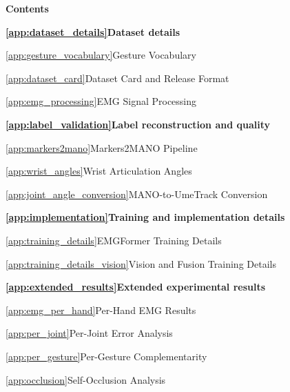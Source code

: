 \documentclass[letterpaper]{article} %
\begin{document}
\begingroup
\small
\setlength{\parskip}{1pt}
\noindent\textbf{Contents}\par
\smallskip
\noindent
\textbf{\ref{app:dataset_details}\quad Dataset details}
  \dotfill \pageref{app:dataset_details}\par
\hspace*{1.5em}\ref{app:gesture_vocabulary}\quad Gesture Vocabulary
  \dotfill \pageref{app:gesture_vocabulary}\par
\hspace*{1.5em}\ref{app:dataset_card}\quad Dataset Card and Release Format
  \dotfill \pageref{app:dataset_card}\par
\hspace*{1.5em}\ref{app:emg_processing}\quad EMG Signal Processing
  \dotfill \pageref{app:emg_processing}\par
\smallskip
\noindent
\textbf{\ref{app:label_validation}\quad Label reconstruction and quality}
  \dotfill \pageref{app:label_validation}\par
\hspace*{1.5em}\ref{app:markers2mano}\quad Markers2MANO Pipeline
  \dotfill \pageref{app:markers2mano}\par
\hspace*{1.5em}\ref{app:wrist_angles}\quad Wrist Articulation Angles
  \dotfill \pageref{app:wrist_angles}\par
\hspace*{1.5em}\ref{app:joint_angle_conversion}\quad MANO-to-UmeTrack Conversion
  \dotfill \pageref{app:joint_angle_conversion}\par
\smallskip
\noindent
\textbf{\ref{app:implementation}\quad Training and implementation details}
  \dotfill \pageref{app:implementation}\par
\hspace*{1.5em}\ref{app:training_details}\quad EMGFormer Training Details
  \dotfill \pageref{app:training_details}\par
\hspace*{1.5em}\ref{app:training_details_vision}\quad Vision and Fusion Training Details
  \dotfill \pageref{app:training_details_vision}\par
\smallskip
\noindent
\textbf{\ref{app:extended_results}\quad Extended experimental results}
  \dotfill \pageref{app:extended_results}\par
\hspace*{1.5em}\ref{app:emg_per_hand}\quad Per-Hand EMG Results
  \dotfill \pageref{app:emg_per_hand}\par
\hspace*{1.5em}\ref{app:per_joint}\quad Per-Joint Error Analysis
  \dotfill \pageref{app:per_joint}\par
\hspace*{1.5em}\ref{app:per_gesture}\quad Per-Gesture Complementarity
  \dotfill \pageref{app:per_gesture}\par
\hspace*{1.5em}\ref{app:occlusion}\quad Self-Occlusion Analysis
  \dotfill \pageref{app:occlusion}\par
\par
\endgroup
\medskip
\end{document}
